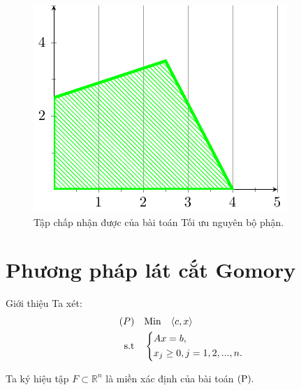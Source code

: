 \documentclass[10pt]{beamer}
\begin{document}
\begin{frame}
\begin{figure}[h]
    \centering
    \includegraphics[width=0.7\linewidth]{nguyenbophan.pdf}
    \caption{Tập chấp nhận được của bài toán Tối ưu nguyên bộ phận.}
\end{figure}
\end{frame}
    






































\section{Phương pháp lát cắt Gomory}

\begin{frame}{Giới thiệu}
\vspace{-40pt}
Ta xét:\\
    \begin{equation}
     \begin{split}
         {(P)} & \quad {\rm Min}  \quad\langle c,x \rangle\\
          \rm{s.t} &\quad \left\{\begin{split}
            & Ax= b,\\
           & x_j \ge 0, j=1,2,...,n.\\
           \end{split}\right.
       \end{split}
   \end{equation}

  Ta ký hiệu tập $ F \subset \mathbb R^n$ là miền xác định của bài toán ${\rm (P)}.$
\end{frame}
\end{document}
